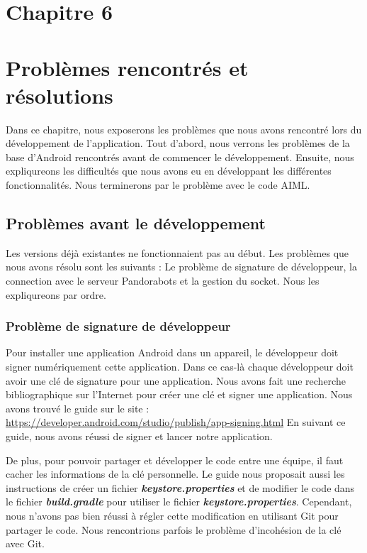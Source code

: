 \section*{Chapitre 6}
\section{Problèmes rencontrés et résolutions}

\indent Dans ce chapitre, nous exposerons les problèmes que nous avons rencontré lors du développement de l'application. Tout d'abord, nous verrons les problèmes de la base d'Android rencontrés avant de commencer le développement. Ensuite, nous expliqureons les difficultés que nous avons eu en développant les différentes fonctionnalités. Nous terminerons par le problème avec le code AIML.

\subsection{Problèmes avant le développement}

\indent Les versions déjà existantes ne fonctionnaient pas au début. Les problèmes que nous avons résolu sont les suivants : Le problème de signature de développeur, la connection avec le serveur Pandorabots et la gestion du socket. Nous les expliqureons par ordre.

\subsubsection{Problème de signature de développeur}

\indent Pour installer une application Android dans un appareil, le développeur doit signer numériquement cette application. Dans ce cas-là chaque développeur doit avoir une clé de signature pour une application. Nous avons fait une recherche bibliographique sur l'Internet pour créer une clé et signer une application. Nous avons trouvé le guide sur le site : 
\url{https://developer.android.com/studio/publish/app-signing.html}
En suivant ce guide, nous avons réussi de signer et lancer notre application.

\indent De plus, pour pouvoir partager et développer le code entre une équipe, il faut cacher les informations de la clé personnelle. Le guide nous proposait aussi les instructions de créer un fichier \textbf{\emph{keystore.properties}} et de modifier le code dans le fichier \textbf{\emph{build.gradle}} pour utiliser le fichier \textbf{\emph{keystore.properties}}. Cependant, nous n'avons pas bien réussi à régler cette modification en utilisant Git pour partager le code. Nous rencontrions parfois le problème d'incohésion de la clé avec Git.

